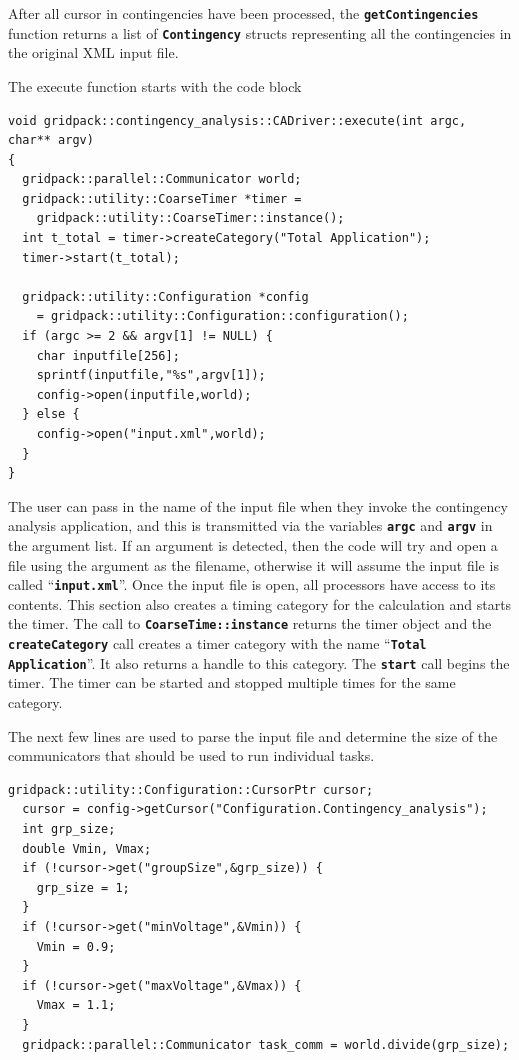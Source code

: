 \documentclass[12pt]{report} %
\begin{document}
After all cursor in contingencies have been processed, the \texttt{\textbf{getContingencies}} function returns a list of \texttt{\textbf{Contingency}} structs representing all the contingencies in the original XML input file.

The execute function starts with the code block

{
\color{red}
\begin{Verbatim}[fontseries=b]
void gridpack::contingency_analysis::CADriver::execute(int argc, char** argv)
{
  gridpack::parallel::Communicator world;
  gridpack::utility::CoarseTimer *timer =
    gridpack::utility::CoarseTimer::instance();
  int t_total = timer->createCategory("Total Application");
  timer->start(t_total);

  gridpack::utility::Configuration *config
    = gridpack::utility::Configuration::configuration();
  if (argc >= 2 && argv[1] != NULL) {
    char inputfile[256];
    sprintf(inputfile,"%s",argv[1]);
    config->open(inputfile,world);
  } else {
    config->open("input.xml",world);
  }
}
\end{Verbatim}
}

The user can pass in the name of the input file when they invoke the contingency analysis application, and this is transmitted via the variables \texttt{\textbf{argc}} and \texttt{\textbf{argv}} in the argument list. If an argument is detected, then the code will try and open a file using the argument as the filename, otherwise it will assume the input file is called ``\texttt{\textbf{input.xml}}''. Once the input file is open, all processors have access to its contents. This section also creates a timing category for the calculation and starts the timer. The call to \texttt{\textbf{CoarseTime::instance}} returns the timer object and the \texttt{\textbf{createCategory}} call creates a timer category with the name ``\texttt{\textbf{Total Application}}''. It also returns a handle to this category. The \texttt{\textbf{start}} call begins the timer. The timer can be started and stopped multiple times for the same category.

The next few lines are used to parse the input file and determine the size of the communicators that should be used to run individual tasks.

{
\color{red}
\begin{Verbatim}[fontseries=b]
  gridpack::utility::Configuration::CursorPtr cursor;
  cursor = config->getCursor("Configuration.Contingency_analysis");
  int grp_size;
  double Vmin, Vmax;
  if (!cursor->get("groupSize",&grp_size)) {
    grp_size = 1;
  }
  if (!cursor->get("minVoltage",&Vmin)) {
    Vmin = 0.9;
  }
  if (!cursor->get("maxVoltage",&Vmax)) {
    Vmax = 1.1;
  }
  gridpack::parallel::Communicator task_comm = world.divide(grp_size);
\end{Verbatim}
}
\end{document}
